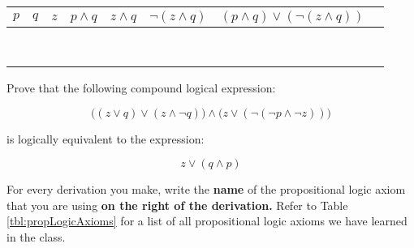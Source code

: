 \documentclass[letterpaper,12pt]{article}
\begin{document}
\begin{center}
	\begin{table}[H] 
		\Large 
		\setlength{\tabcolsep}{16pt}
		\begin{tabular}{|c|c|c|c|c|c|c| p{5.25in}|} \hline 
			$p$ & $q$ & $z$ & $p \land q$ & $z \land q$ & $ \neg (z \land q)$ & $(p \land q ) \lor (\neg (z \land q)) $\\ \hline
			\F & \F & \F & & & &   \\ \hline 		
			\F & \F & \T & & & & \\ \hline 		
			\F & \T & \F & & & &  \\ \hline 		
			\F & \T & \T & & & &\\ \hline
			\T & \F & \F & & & &\\ \hline 		
			\T & \F & \T & & & &\\ \hline
			\T & \T & \F & & & &\\ \hline 		
			\T & \T & \T & & & &\\ \hline												
		\end{tabular}
	\end{table}
\end{center} \vspace{-.7in}

\freespace

\pagebreak



{\large Prove that the following compound logical expression: }

{\Large $$ \big (   ( z \lor q  ) \lor   ( z \land \neg q   )  \big ) \land  \big ( z \lor   ( \neg    ( \neg p \land \neg z   )   )  \big )$$ }
\vspace{-.1in}

{\large is logically equivalent to the expression: } 

{\Large $$z \lor (q \land p) $$ }

{\large For every derivation you make, write the \textbf{name} of the propositional logic axiom that you are using \textbf{on the right of the derivation.} Refer to Table \ref{tbl:propLogicAxioms} for a list of all propositional logic axioms we have learned in the class. }
\answerspacefullpage



\newcommand{\emptybox}[1]{\framebox(#1,#1){} }
 
\end{document}

